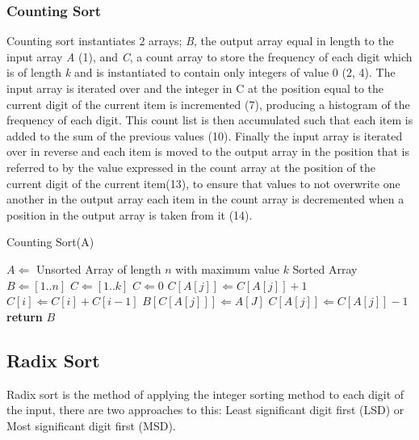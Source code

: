 \documentclass[12pt]{article}
\begin{document}
	\pagebreak
	\subsubsection{Counting Sort}
	\label{ssec:counting}
	Counting sort instantiates 2 arrays; \textit{B}, the output array equal in length to the input array \textit{A} (1), and \textit{C}, a count array to store the frequency of each digit which is of length \textit{k} and is instantiated to contain only integers of value 0 (2, 4). The input array is iterated over and the integer in C at the position equal to the current digit of the current item is incremented (7), producing a histogram of the frequency of each digit. This count list is then accumulated such that each item is added to the sum of the previous values (10). Finally the input array is iterated over in reverse and each item is moved to the output array in the position that is referred to by the value expressed in the count array at the position of the current digit of the current item(13), to ensure that values to not overwrite one another in the output array each item in the count array is decremented when a position in the output array is taken from it (14).
	\begin{algorithm}[H] %
		\caption{Counting Sort({A})} %
		\label{alg2} %
		\begin{algorithmic}[1] %
			\REQUIRE $A \Leftarrow$ Unsorted Array of length $n$ with maximum value $k$
			\ENSURE Sorted Array
			\STATE $B \Leftarrow [1..n]$ 
			\STATE $C \Leftarrow [1..k]$ 
				\STATE $C \Leftarrow 0$
			\ENDFOR
				\STATE $C[A[j]] \Leftarrow C[A[j]] + 1$ 
			\ENDFOR
				\STATE $C[i] \Leftarrow C[i] + C[i-1]$
			\ENDFOR
				\STATE $B[C[A[j]]] \Leftarrow A[J]$ 
				\STATE $C[A[j]] \Leftarrow C[A[j]] - 1$ 
			\ENDFOR
			\STATE \textbf{return} $B$
		\end{algorithmic}
	\end{algorithm}	
	\pagebreak
	\subsection{Radix Sort}
	Radix sort is the method of applying the integer sorting method to each digit of the input, there are two approaches to this: Least significant digit first (LSD) or Most significant digit first (MSD).
\end{document}
